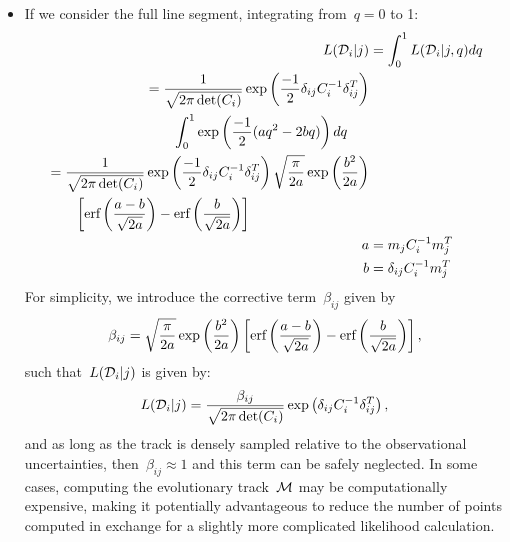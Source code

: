 \documentclass[ms.tex]{subfiles}
\begin{document}
\begin{itemize}
	\item If we consider the full line segment, integrating from~$q = 0$ to 1:
	\begin{subequations}\begin{align}
	L(\mathcal{D}_i | j) &= \int_0^1 L(\mathcal{D}_i | j, q) dq
	\\
	\begin{split}
	&= \frac{1}{\sqrt{2\pi \det(C_i)}}
	\exp\left(\frac{-1}{2}\delta_{ij}C_i^{-1}\delta_{ij}^T\right)
	\\
	&\qquad \int_0^1 \exp\left(\frac{-1}{2}(aq^2 - 2bq)\right)dq
	\end{split}
	\\
	\begin{split}
	&= \frac{1}{\sqrt{2\pi \det(C_i)}}
	\exp\left(\frac{-1}{2}\delta_{ij}C_i^{-1}\delta_{ij}^T\right)
	\sqrt{\frac{\pi}{2a}} \exp\left(\frac{b^2}{2a}\right)
	\\
	&\qquad \left[\text{erf}\left(\frac{a - b}{\sqrt{2a}}\right) -
	\text{erf}\left(\frac{b}{\sqrt{2a}}\right)\right]
	\end{split}
	\\
	a &= m_j C_i^{-1} m_j^T
	\\
	b &= \delta_{ij} C_i^{-1} m_j^T
	\end{align}\end{subequations}
	For simplicity, we introduce the corrective term~$\beta_{ij}$ given by
	\begin{equation}
	\beta_{ij} = \sqrt{\frac{\pi}{2a}}
	\exp\left(\frac{b^2}{2a}\right)
	\left[
	\text{erf}\left(\frac{a - b}{\sqrt{2a}}\right) -
	\text{erf}\left(\frac{b}{\sqrt{2a}}\right)
	\right],
	\label{eq:corrective_beta}
	\end{equation}
	such that~$L(\mathcal{D}_i | j)$ is given by:
	\begin{equation}
	L(\mathcal{D}_i | j) = \frac{\beta_{ij}}{\sqrt{2\pi \det(C_i)}}
	\exp\left(\delta_{ij}C_i^{-1}\delta_{ij}^T\right),
	\end{equation}
	and as long as the track is densely sampled relative to the observational
	uncertainties, then~$\beta_{ij} \approx 1$ and this term can be safely
	neglected.
	In some cases, computing the evolutionary track~$\mathcal{M}$ may be
	computationally expensive, making it potentially advantageous to reduce the
	number of points computed in exchange for a slightly more complicated
	likelihood calculation.


\end{itemize}
\end{document}

